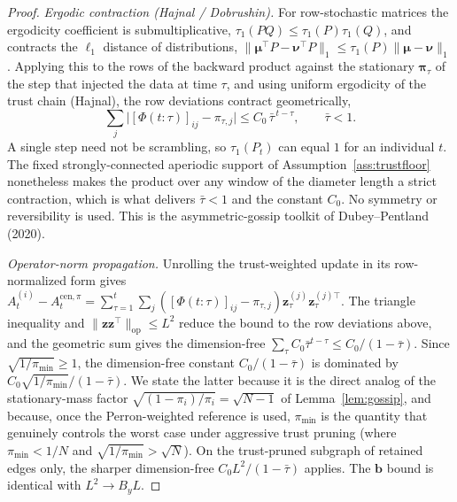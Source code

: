 \documentclass[11pt]{article}
\begin{document}
\begin{proof}
\emph{Ergodic contraction (Hajnal / Dobrushin).}  For row-stochastic
matrices the ergodicity coefficient is submultiplicative,
$\tau_1(PQ)\leq\tau_1(P)\tau_1(Q)$, and contracts the $\ell_1$ distance
of distributions, $\|\bm\mu^\top P-\bm\nu^\top P\|_1\leq\tau_1(P)\|\bm\mu-\bm\nu\|_1$.
Applying this to the rows of the backward product against the stationary
$\bm\pi_\tau$ of the step that injected the data at time $\tau$, and
using uniform ergodicity of the trust chain (Hajnal), the row deviations
contract geometrically,
\[
\sum_j\bigl|[\Phi(t{:}\tau)]_{ij}-\pi_{\tau,j}\bigr|
\leq C_0\,\bar\tau^{\,t-\tau},
\qquad \bar\tau<1 .
\]
A single step need not be scrambling, so $\tau_1(P_t)$ can equal $1$ for
an individual $t$.  The fixed strongly-connected aperiodic support of
Assumption~\ref{ass:trustfloor} nonetheless makes the product over any
window of the diameter length a strict contraction, which is what
delivers $\bar\tau<1$ and the constant $C_0$.  No symmetry or
reversibility is used. This is the asymmetric-gossip toolkit of
Dubey--Pentland (2020).

\emph{Operator-norm propagation.}  Unrolling the trust-weighted update in
its row-normalized form gives
$A_t^{(i)}-A_t^{\mathrm{cen},\pi}
=\sum_{\tau=1}^t\sum_j([\Phi(t{:}\tau)]_{ij}-\pi_{\tau,j})
\bm{z}_\tau^{(j)}\bm{z}_\tau^{(j)\top}$.
The triangle inequality and $\|\bm z\bm z^\top\|_{\mathrm{op}}\leq L^2$
reduce the bound to the row deviations above, and the geometric sum gives
the dimension-free $\sum_\tau C_0\bar\tau^{t-\tau}\leq C_0/(1-\bar\tau)$.
Since $\sqrt{1/\pi_{\min}}\geq 1$, the dimension-free constant
$C_0/(1-\bar\tau)$ is dominated by
$C_0\sqrt{1/\pi_{\min}}/(1-\bar\tau)$.  We state the latter because it is
the direct analog of the stationary-mass factor
$\sqrt{(1-\pi_i)/\pi_i}=\sqrt{N-1}$ of Lemma~\ref{lem:gossip}, and
because, once the Perron-weighted reference is used, $\pi_{\min}$ is the
quantity that genuinely controls the worst case under aggressive trust
pruning (where $\pi_{\min}<1/N$ and $\sqrt{1/\pi_{\min}}>\sqrt N$).  On
the trust-pruned subgraph of retained edges only, the sharper
dimension-free $C_0 L^2/(1-\bar\tau)$ applies.  The $\bm b$ bound is
identical with $L^2\to B_y L$.
\end{proof}
\end{document}
